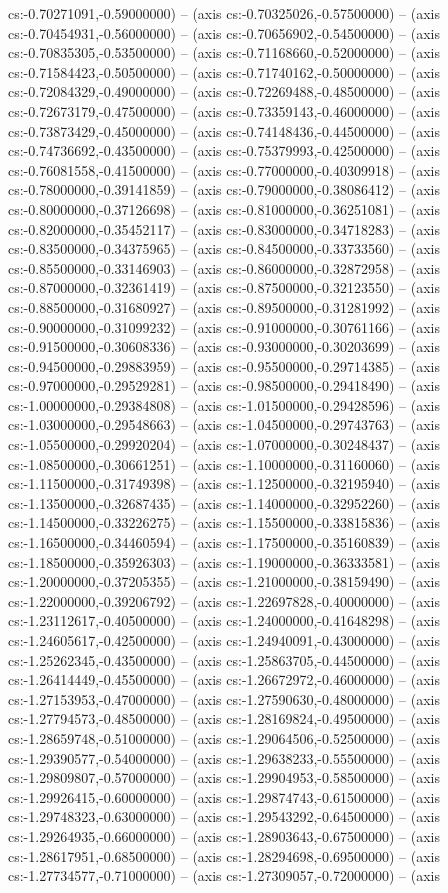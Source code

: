 cs:-0.70271091,-0.59000000) -- (axis cs:-0.70325026,-0.57500000) -- (axis cs:-0.70454931,-0.56000000) -- (axis cs:-0.70656902,-0.54500000) -- (axis cs:-0.70835305,-0.53500000) -- (axis cs:-0.71168660,-0.52000000) -- (axis cs:-0.71584423,-0.50500000) -- (axis cs:-0.71740162,-0.50000000) -- (axis cs:-0.72084329,-0.49000000) -- (axis cs:-0.72269488,-0.48500000) -- (axis cs:-0.72673179,-0.47500000) -- (axis cs:-0.73359143,-0.46000000) -- (axis cs:-0.73873429,-0.45000000) -- (axis cs:-0.74148436,-0.44500000) -- (axis cs:-0.74736692,-0.43500000) -- (axis cs:-0.75379993,-0.42500000) -- (axis cs:-0.76081558,-0.41500000) -- (axis cs:-0.77000000,-0.40309918) -- (axis cs:-0.78000000,-0.39141859) -- (axis cs:-0.79000000,-0.38086412) -- (axis cs:-0.80000000,-0.37126698) -- (axis cs:-0.81000000,-0.36251081) -- (axis cs:-0.82000000,-0.35452117) -- (axis cs:-0.83000000,-0.34718283) -- (axis cs:-0.83500000,-0.34375965) -- (axis cs:-0.84500000,-0.33733560) -- (axis cs:-0.85500000,-0.33146903) -- (axis cs:-0.86000000,-0.32872958) -- (axis cs:-0.87000000,-0.32361419) -- (axis cs:-0.87500000,-0.32123550) -- (axis cs:-0.88500000,-0.31680927) -- (axis cs:-0.89500000,-0.31281992) -- (axis cs:-0.90000000,-0.31099232) -- (axis cs:-0.91000000,-0.30761166) -- (axis cs:-0.91500000,-0.30608336) -- (axis cs:-0.93000000,-0.30203699) -- (axis cs:-0.94500000,-0.29883959) -- (axis cs:-0.95500000,-0.29714385) -- (axis cs:-0.97000000,-0.29529281) -- (axis cs:-0.98500000,-0.29418490) -- (axis cs:-1.00000000,-0.29384808) -- (axis cs:-1.01500000,-0.29428596) -- (axis cs:-1.03000000,-0.29548663) -- (axis cs:-1.04500000,-0.29743763) -- (axis cs:-1.05500000,-0.29920204) -- (axis cs:-1.07000000,-0.30248437) -- (axis cs:-1.08500000,-0.30661251) -- (axis cs:-1.10000000,-0.31160060) -- (axis cs:-1.11500000,-0.31749398) -- (axis cs:-1.12500000,-0.32195940) -- (axis cs:-1.13500000,-0.32687435) -- (axis cs:-1.14000000,-0.32952260) -- (axis cs:-1.14500000,-0.33226275) -- (axis cs:-1.15500000,-0.33815836) -- (axis cs:-1.16500000,-0.34460594) -- (axis cs:-1.17500000,-0.35160839) -- (axis cs:-1.18500000,-0.35926303) -- (axis cs:-1.19000000,-0.36333581) -- (axis cs:-1.20000000,-0.37205355) -- (axis cs:-1.21000000,-0.38159490) -- (axis cs:-1.22000000,-0.39206792) -- (axis cs:-1.22697828,-0.40000000) -- (axis cs:-1.23112617,-0.40500000) -- (axis cs:-1.24000000,-0.41648298) -- (axis cs:-1.24605617,-0.42500000) -- (axis cs:-1.24940091,-0.43000000) -- (axis cs:-1.25262345,-0.43500000) -- (axis cs:-1.25863705,-0.44500000) -- (axis cs:-1.26414449,-0.45500000) -- (axis cs:-1.26672972,-0.46000000) -- (axis cs:-1.27153953,-0.47000000) -- (axis cs:-1.27590630,-0.48000000) -- (axis cs:-1.27794573,-0.48500000) -- (axis cs:-1.28169824,-0.49500000) -- (axis cs:-1.28659748,-0.51000000) -- (axis cs:-1.29064506,-0.52500000) -- (axis cs:-1.29390577,-0.54000000) -- (axis cs:-1.29638233,-0.55500000) -- (axis cs:-1.29809807,-0.57000000) -- (axis cs:-1.29904953,-0.58500000) -- (axis cs:-1.29926415,-0.60000000) -- (axis cs:-1.29874743,-0.61500000) -- (axis cs:-1.29748323,-0.63000000) -- (axis cs:-1.29543292,-0.64500000) -- (axis cs:-1.29264935,-0.66000000) -- (axis cs:-1.28903643,-0.67500000) -- (axis cs:-1.28617951,-0.68500000) -- (axis cs:-1.28294698,-0.69500000) -- (axis cs:-1.27734577,-0.71000000) -- (axis cs:-1.27309057,-0.72000000) -- (axis 